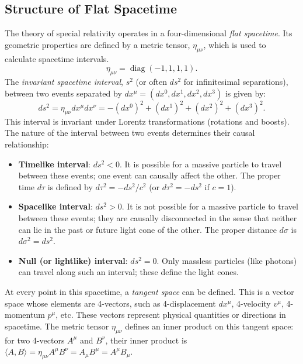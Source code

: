 \documentclass{amsart}
\theoremstyle{definition}
\theoremstyle{remark}
\DeclareMathOperator{\diag}{diag}
\begin{document}
\subsection{Structure of Flat Spacetime}
\label{subsec:sr_structure}
The theory of special relativity operates in a four-dimensional \emph{flat spacetime}.
Its geometric properties are defined by a metric tensor, $\eta_{\mu\nu}$, which is used to calculate spacetime intervals.
\begin{equation*}
  \eta_{\mu\nu} = \diag(-1,1,1,1).
\end{equation*}
The \emph{invariant spacetime interval}, $s^2$ (or often $ds^2$ for infinitesimal separations), between two events separated by $dx^\mu = (dx^0, dx^1, dx^2, dx^3)$ is given by:
\begin{equation*}
  ds^2 = \eta_{\mu\nu} dx^\mu dx^\nu = -(dx^0)^2 + (dx^1)^2 + (dx^2)^2 + (dx^3)^2.
\end{equation*}
This interval is invariant under Lorentz transformations (rotations and boosts).
The nature of the interval between two events determines their causal relationship:
\begin{itemize}
    \item \textbf{Timelike interval}: $ds^2 < 0$.
    It is possible for a massive particle to travel between these events; one event can causally affect the other.
    The proper time $d\tau$ is defined by $d\tau^2 = -ds^2/c^2$ (or $d\tau^2 = -ds^2$ if $c=1$).
    \item \textbf{Spacelike interval}: $ds^2 > 0$.
    It is not possible for a massive particle to travel between these events; they are causally disconnected in the sense that neither can lie in the past or future light cone of the other.
    The proper distance $d\sigma$ is $d\sigma^2 = ds^2$.
    \item \textbf{Null (or lightlike) interval}: $ds^2 = 0$.
    Only massless particles (like photons) can travel along such an interval; these define the light cones.
\end{itemize}

At every point in this spacetime, a \emph{tangent space} can be defined.
This is a vector space whose elements are 4-vectors, such as 4-displacement $dx^\mu$, 4-velocity $v^\mu$, 4-momentum $p^\mu$, etc.
These vectors represent physical quantities or directions in spacetime.
The metric tensor $\eta_{\mu\nu}$ defines an inner product on this tangent space: for two 4-vectors $A^\mu$ and $B^\nu$, their inner product is $\langle A, B \rangle = \eta_{\mu\nu} A^\mu B^\nu = A_\mu B^\mu = A^\mu B_\mu$.
\end{document}
